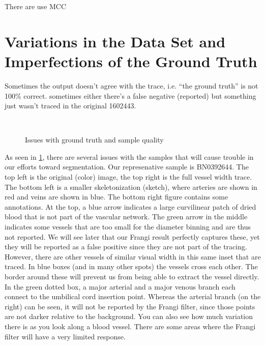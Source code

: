 There are 
use MCC \cite{mcc-original-paper}



\section{Variations in the Data Set and Imperfections of the Ground Truth} \label{sec:NCS-dataset-issues}

Sometimes the output doesn't agree with the trace, i.e. ``the ground truth'' is not 100\% correct.
sometimes either there's a false negative (reported) but something just wasn't traced in the original  1602443.

\begin{figure} \centering
 \\
\caption{Issues with ground truth and sample quality}
\label{fig:groundtruth-samplequality}
\end{figure}

As seen in \cref{fig:groundtruth-samplequality}, there are several issues with the samples that will cause trouble in our efforts toward segmentation. Our represenative sample is BN0392644. The top left is the original (color) image, the top right is the full vessel width trace. The bottom left is a smaller skeletonization (sketch), where arteries are shown in red and veins are shown in blue. The bottom right figure contains some annotations. At the top, a blue arrow indicates a large curvilinear patch of dried blood that is not part of the vascular network. The green arrow in the middle indicates some vessels that are too small for the diameter binning and are thus not reported. We will see later that our Frangi result perfectly captures these, yet they will be reported as a false positive since they are not part of the tracing. However, there are other vessels of similar visual width in this same inset that are traced. In blue boxes (and in many other spots) the vessels cross each other. The border around these will prevent us from being able to extract the vessel directly. In the green dotted box, a major arterial and a major venous branch each connect to the umbilical cord insertion point. Whereas the arterial branch (on the right) can be seen, it will not be reported by the Frangi filter, since those points are not darker relative to the background. You can also see how much variation there is as you look along a blood vessel. There are some areas where the Frangi filter will have a very limited response. 



